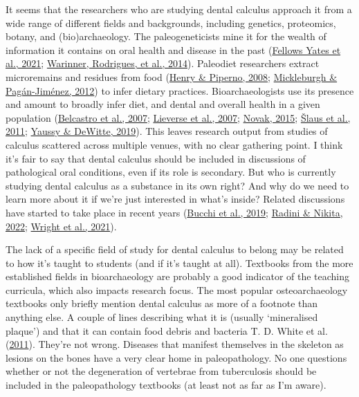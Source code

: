 \documentclass[
  b5paper,
]{book}
\begin{document}
It seems that the researchers who are studying dental calculus approach
it from a wide range of different fields and backgrounds, including
genetics, proteomics, botany, and (bio)archaeology. The paleogeneticists
mine it for the wealth of information it contains on oral health and
disease in the past
(\protect\hyperlink{ref-yatesOralMicrobiome2021}{Fellows Yates et al.,
2021}; \protect\hyperlink{ref-warinnerPathogensHost2014}{Warinner,
Rodrigues, et al., 2014}). Paleodiet researchers extract microremains
and residues from food
(\protect\hyperlink{ref-henryCalculusSyria2008}{Henry \& Piperno, 2008};
\protect\hyperlink{ref-mickleburghNewInsights2012}{Mickleburgh \&
Pagán-Jiménez, 2012}) to infer dietary practices. Bioarchaeologists use
its presence and amount to broadly infer diet, and dental and overall
health in a given population
(\protect\hyperlink{ref-belcastroContinuityDiscontinuity2007}{Belcastro
et al., 2007}; \protect\hyperlink{ref-lieverseDentalHealth2007}{Lieverse
et al., 2007}; \protect\hyperlink{ref-novakDentalHealth2015}{Novak,
2015}; \protect\hyperlink{ref-slausDentalHealth2011}{Šlaus et al.,
2011}; \protect\hyperlink{ref-yaussyCalculusSurvivorship2019}{Yaussy \&
DeWitte, 2019}). This leaves research output from studies of calculus
scattered across multiple venues, with no clear gathering point. I think
it's fair to say that dental calculus should be included in discussions
of pathological oral conditions, even if its role is secondary. But who
is currently studying dental calculus as a substance in its own right?
And why do we need to learn more about it if we're just interested in
what's inside? Related discussions have started to take place in recent
years (\protect\hyperlink{ref-bucchiComparisonsMethods2019}{Bucchi et
al., 2019}; \protect\hyperlink{ref-radiniDirtyTeeth2022}{Radini \&
Nikita, 2022};
\protect\hyperlink{ref-wrightAdvancingRefining2021}{Wright et al.,
2021}).

The lack of a specific field of study for dental calculus to belong may
be related to how it's taught to students (and if it's taught at all).
Textbooks from the more established fields in bioarchaeology are
probably a good indicator of the teaching curricula, which also impacts
research focus. The most popular osteoarchaeology textbooks only briefly
mention dental calculus as more of a footnote than anything else. A
couple of lines describing what it is (usually `mineralised plaque') and
that it can contain food debris and bacteria T. D. White et al.
(\protect\hyperlink{ref-whiteHumanOsteology2011}{2011}). They're not
wrong. Diseases that manifest themselves in the skeleton as lesions on
the bones have a very clear home in paleopathology. No one questions
whether or not the degeneration of vertebrae from tuberculosis should be
included in the paleopathology textbooks (at least not as far as I'm
aware).
\end{document}

